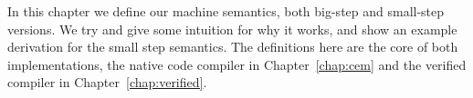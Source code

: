 In this chapter we define our \ce machine semantics, both big-step and
small-step versions. We try and give some intuition for why it works, and show
an example derivation for the small step semantics. The definitions here are the
core of both implementations, the native code compiler in Chapter~\ref{chap:cem}
and the verified compiler in Chapter~\ref{chap:verified}.
